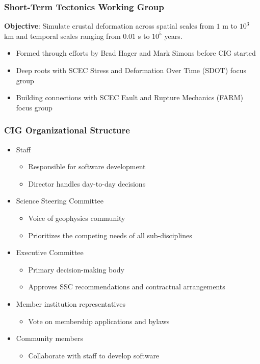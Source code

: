 \documentclass{beamer}
\begin{document}
\begin{frame}
  \frametitle{Short-Term Tectonics Working Group}
  \summary{}
 
 \vfill
 
 \textbf{Objective}: Simulate crustal deformation across spatial
 scales from $1$ m to $10^3$ km and temporal scales ranging from
 $0.01$ s to $10^5$ years.

 \vfill
 \begin{itemize}
 \item Formed through efforts by Brad Hager and Mark Simons before CIG started
 \item Deep roots with SCEC Stress and Deformation Over Time (SDOT) focus group
 \item Building connections with SCEC Fault and Rupture Mechanics (FARM) focus group
 \end{itemize}
\vfill

\end{frame} 


\begin{frame}
  \frametitle{CIG Organizational Structure}
  \summary{}
 
  \begin{itemize}
  \item Staff
    \begin{itemize}
    \item Responsible for software development
    \item Director handles day-to-day decisions
    \end{itemize}
  \item Science Steering Committee
    \begin{itemize}
    \item Voice of geophysics community
    \item Prioritizes the competing needs of all sub-disciplines
    \end{itemize}
  \item Executive Committee
    \begin{itemize}
    \item Primary decision-making body
    \item Approves SSC recommendations and contractual arrangements
    \end{itemize}
  \item Member institution representatives
    \begin{itemize}
    \item Vote on membership applications and bylaws
    \end{itemize}
  \item Community members
    \begin{itemize}
    \item Collaborate with staff to develop software
    \end{itemize}
  \end{itemize}

\end{frame}
\end{document}
